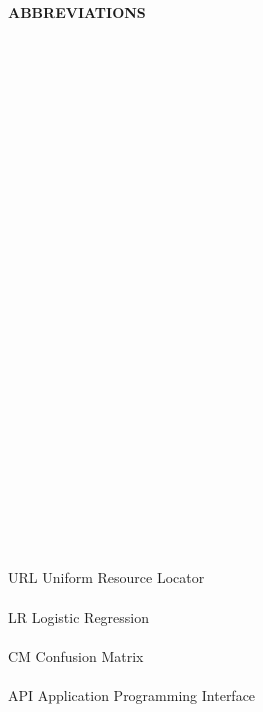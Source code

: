 \begin{center}
\textbf{\LARGE{ABBREVIATIONS}}\\[1cm]

\end{center}
\normalsize

\\\\\\\\\\\\\\\\\\\\\\\\\\\\\\\\\


\\\\



\\\\\\\


\\\\


\begin{abbrv}
\hspace{-0.7cm} 
URL      \hspace{4.05cm} Uniform Resource Locator\\\\
LR     \hspace{4.55cm}Logistic Regression\\\\
CM    \hspace{4.3cm} Confusion Matrix\\\\
API     \hspace{4.25cm} Application Programming Interface\\\\
\end{abbrv}
